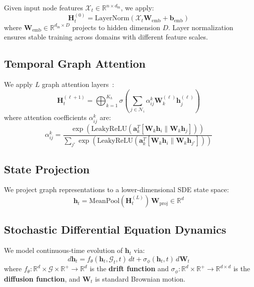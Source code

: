 \documentclass[10pt,journal,compsoc]{IEEEtran}
\newcommand{\R}{\mathbb{R}}
\newcommand{\G}{\mathcal{G}}
\newcommand{\X}{\mathcal{X}}
\begin{document}
Given input node features $\X_t \in \R^{n \times d_{\text{in}}}$, we apply:
\begin{equation}
\mathbf{H}^{(0)}_t = \text{LayerNorm}(\X_t \mathbf{W}_{\text{emb}} + \mathbf{b}_{\text{emb}})
\end{equation}
where $\mathbf{W}_{\text{emb}} \in \R^{d_{\text{in}} \times D}$ projects to hidden dimension $D$. Layer normalization ensures stable training across domains with different feature scales.

\vspace{-0.2cm}
\subsection{Temporal Graph Attention}

We apply $L$ graph attention layers~\cite{velivckovic2017graph}:
\begin{equation}
\mathbf{H}^{(\ell+1)}_t = \bigoplus_{k=1}^{K_h} \sigma\!\left(\sum_{j \in \mathcal{N}_i} \alpha_{ij}^k \mathbf{W}_k^{(\ell)} \mathbf{h}_j^{(\ell)}\right)
\end{equation}
where attention coefficients $\alpha_{ij}^k$ are:
\begin{equation}
\alpha_{ij}^k = \frac{\exp(\text{LeakyReLU}(\mathbf{a}_k^T [\mathbf{W}_k \mathbf{h}_i \| \mathbf{W}_k \mathbf{h}_j]))}{\sum_{j'} \exp(\text{LeakyReLU}(\mathbf{a}_k^T [\mathbf{W}_k \mathbf{h}_i \| \mathbf{W}_k \mathbf{h}_{j'}]))}
\end{equation}

\vspace{-0.2cm}
\subsection{State Projection}

We project graph representations to a lower-dimensional SDE state space:
\begin{equation}
\mathbf{h}_t = \text{MeanPool}(\mathbf{H}^{(L)}_t)\, \mathbf{W}_{\text{proj}} \in \R^d
\end{equation}

\vspace{-0.2cm}
\subsection{Stochastic Differential Equation Dynamics}

We model continuous-time evolution of $\mathbf{h}_t$ via:
\begin{equation}
d\mathbf{h}_t = f_\theta(\mathbf{h}_t, \G_t, t)\,dt + \sigma_\phi(\mathbf{h}_t, t)\,d\mathbf{W}_t
\label{eq:sde}
\end{equation}
where $f_\theta: \R^d \times \G \times \R^+ \to \R^d$ is the \textbf{drift function} and $\sigma_\phi: \R^d \times \R^+ \to \R^{d \times d}$ is the \textbf{diffusion function}, and $\mathbf{W}_t$ is standard Brownian motion.
\end{document}
